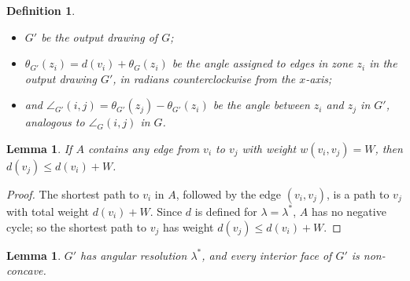 \documentclass[11pt,letter]{article}
\newtheorem{lemma}[theorem]{Lemma}
\newtheorem{definition}[theorem]{Definition}
\begin{document}
\begin{definition}
\begin{itemize}
\begin{itemize}
   \item if a corresponding angle in $G$ is exterior, opposing edges with weights $w(v_i,v_j)= 3\pi + \theta_G(z_i) - \theta_G(z_j)$ and $w(v_j,v_i)=\pi+\theta_G(z_j)-\theta_G(z_i)$;
   \end{itemize}
\item $G'$ be the output drawing of $G$;
\item $\theta_{G'}(z_i) = d(v_i)+\theta_{G}(z_i)$ be the angle assigned to edges in zone $z_i$ in the output drawing $G'$, in radians counterclockwise from the $x$-axis;
\item and $\angle_{G'}(i,j)=\theta_{G'}(z_j)-\theta_{G'}(z_i)$ be the angle between $z_i$ and $z_j$ in $G'$, analogous to $\angle_G(i,j)$ in $G$.
\end{itemize}
\end{definition}

\begin{lemma}
\label{lemma:path_lengths}
If $A$ contains any edge from $v_i$ to $v_j$ with weight $w(v_i,v_j)=W$, then $d(v_j) \leq d(v_i)+W$.
\end{lemma}

\begin{proof}
The shortest path to $v_i$ in $A$, followed by the edge $(v_i,v_j)$, is a path to $v_j$ with total weight $d(v_i)+W$.  Since $d$ is defined for $\lambda=\lambda^*$,  $A$ has no negative cycle; so the shortest path to $v_j$ has weight $d(v_j) \leq d(v_i)+W$.
\end{proof}

\begin{lemma}
\label{lemma:angles}
$G'$ has angular resolution $\lambda^*$, and every interior face of $G'$ is non-concave.
\end{lemma}
\end{document}
